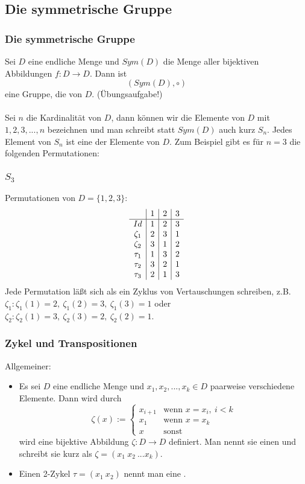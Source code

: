 \subsection{Die symmetrische Gruppe}
%
\begin{frame}\frametitle{Die symmetrische Gruppe}

	Sei $D$ eine endliche Menge und $Sym(D)$ die Menge aller bijektiven Abbildungen $f:D \to D$. Dann ist
	$$
		(Sym(D),\circ)
	$$
	eine Gruppe, die  von $D$. (Übungsaufgabe!)\\
	\quad \pause\\
	Sei $n$ die Kardinalität von $D$, dann können wir die Elemente von $D$ mit $1,2,3,...,n$ bezeichnen und man schreibt statt $Sym(D)$ auch kurz $S_n$. Jedes Element von $S_n$ ist eine  der Elemente von $D$. Zum Beispiel gibt es für $n=3$ die folgenden Permutationen:
		
\end{frame}
%
\begin{frame}\frametitle{$S_3$}
	Permutationen von $D=\{1,2,3\}$:
	$$
		\begin{array}{c | c|c|c}
				& 1 & 2 & 3	\\ \hline
			Id	& 1 & 2 & 3 \\
			\zeta_1	& 2 & 3 & 1 \\
			\zeta_2 & 3 & 1 & 2 \\
			\tau_1 & 1 & 3 & 2 \\
			\tau_2 & 3 & 2 & 1 \\
			\tau_3 & 2 & 1 & 3
		\end{array}
	$$
	\pause
Jede Permutation läßt sich als ein Zyklus von Vertauschungen schreiben, z.B. \\$\zeta_1: \zeta_1(1)=2, \ \zeta_1(2)=3, \ \zeta_1(3)=1$ \quad oder\\
$\zeta_2: \zeta_2(1)=3, \ \zeta_2(3)=2, \ \zeta_2(2)=1$. 	
\end{frame}
%
%
\begin{frame}\frametitle{Zykel und Transpositionen}
Allgemeiner:
\begin{itemize}
	\item Es sei $D$ eine endliche Menge und $x_1,x_2,...,x_k \in D$ paarweise verschiedene Elemente. Dann wird durch
	 $$
	\zeta(x) :=\begin{cases}	
							x_{i+1} & \text{wenn } x=x_i,\ i<k\\
							x_1 & \text{wenn } x=x_k\\
							x & \text{sonst}
	\end{cases}
	$$
	wird eine bijektive Abbildung $\zeta:D\to D$ definiert. Man nennt sie einen  und schreibt sie kurz als $\zeta=(x_1\ x_2\ ... x_k)$. \pause
	\item Einen 2-Zykel $\tau=(x_1\ x_2)$ nennt man eine .
\end{itemize}
%
	
\end{frame}
